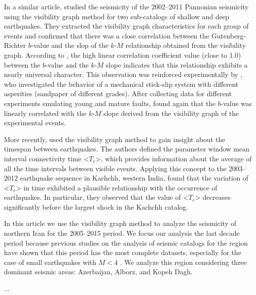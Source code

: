 In a similar article, \citet{Telesca2014} studied the seismicity of the 2002--2011 Pannonian seismicity using the visibility graph method for two sub-catalogs of shallow and deep earthquakes. They extracted the visibility graph characteristics for each group of events and confirmed that there was a close correlation between the Gutenberg-Richter $b$-value and the slop of the $k$-$M$ relationship obtained from the visibility graph. According to \citet{Telesca2014}, the high linear correlation coefficient value (close to 1.0) between the $b$-value and the $k$-$M$ slope indicates that this relationship exhibits a nearly universal character. This observation was reinforced experimentally by \citet{Telesca2014-pone}, who investigated the behavior of a mechanical stick-slip system with different asperities (sandpaper of different grades). After collecting data for different experiments emulating young and mature faults, \citet{Telesca2014-pone} found again that the $b$-value was linearly correlated with the $k$-$M$ slope derived from the visibility graph of the experimental events.

More recently, \citet{Telesca2016} used the visibility graph method to gain insight about the timespan between earthquakes. The authors defined the parameter window mean interval connectivity time <$T_c$>, which provides information about the average of all the time intervals between visible events. Applying this concept to the 2003--2012 earthquake sequence in Kachchh, western India, \citet{Telesca2016} found that the variation of <$T_c$> in time exhibited a plausible relationship with the occurrence of earthquakes. In particular, they observed that the value of <$T_c$> decreases significantly before the largest shock in the Kachchh catalog.

In this article we use the visibility graph method to analyze the seismicity of northern Iran for the 2005--2015 period. We focus our analysis the last decade period because previous studies on the analysis of seismic catalogs for the region have shown that this period has the most complete datasets, especially for the case of small earthquakes with $M<4$ \citep[e.g.][]{Khoshnevis2016}. We analyze this region considering three dominant seismic areas: Azerbaijan, Alborz, and Kopeh Dagh.

...



